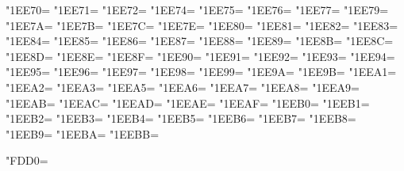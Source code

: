 \XeTeXcharclass"1EE70=\KclassArabU
\XeTeXcharclass"1EE71=\KclassArabU
\XeTeXcharclass"1EE72=\KclassArabU
\XeTeXcharclass"1EE74=\KclassArabU
\XeTeXcharclass"1EE75=\KclassArabU
\XeTeXcharclass"1EE76=\KclassArabU
\XeTeXcharclass"1EE77=\KclassArabU
\XeTeXcharclass"1EE79=\KclassArabU
\XeTeXcharclass"1EE7A=\KclassArabU
\XeTeXcharclass"1EE7B=\KclassArabU
\XeTeXcharclass"1EE7C=\KclassArabU
\XeTeXcharclass"1EE7E=\KclassArabU
\XeTeXcharclass"1EE80=\KclassArabU
\XeTeXcharclass"1EE81=\KclassArabU
\XeTeXcharclass"1EE82=\KclassArabU
\XeTeXcharclass"1EE83=\KclassArabU
\XeTeXcharclass"1EE84=\KclassArabU
\XeTeXcharclass"1EE85=\KclassArabU
\XeTeXcharclass"1EE86=\KclassArabU
\XeTeXcharclass"1EE87=\KclassArabU
\XeTeXcharclass"1EE88=\KclassArabU
\XeTeXcharclass"1EE89=\KclassArabU
\XeTeXcharclass"1EE8B=\KclassArabU
\XeTeXcharclass"1EE8C=\KclassArabU
\XeTeXcharclass"1EE8D=\KclassArabU
\XeTeXcharclass"1EE8E=\KclassArabU
\XeTeXcharclass"1EE8F=\KclassArabU
\XeTeXcharclass"1EE90=\KclassArabU
\XeTeXcharclass"1EE91=\KclassArabU
\XeTeXcharclass"1EE92=\KclassArabU
\XeTeXcharclass"1EE93=\KclassArabU
\XeTeXcharclass"1EE94=\KclassArabU
\XeTeXcharclass"1EE95=\KclassArabU
\XeTeXcharclass"1EE96=\KclassArabU
\XeTeXcharclass"1EE97=\KclassArabU
\XeTeXcharclass"1EE98=\KclassArabU
\XeTeXcharclass"1EE99=\KclassArabU
\XeTeXcharclass"1EE9A=\KclassArabU
\XeTeXcharclass"1EE9B=\KclassArabU
\XeTeXcharclass"1EEA1=\KclassArabU
\XeTeXcharclass"1EEA2=\KclassArabU
\XeTeXcharclass"1EEA3=\KclassArabU
\XeTeXcharclass"1EEA5=\KclassArabU
\XeTeXcharclass"1EEA6=\KclassArabU
\XeTeXcharclass"1EEA7=\KclassArabU
\XeTeXcharclass"1EEA8=\KclassArabU
\XeTeXcharclass"1EEA9=\KclassArabU
\XeTeXcharclass"1EEAB=\KclassArabU
\XeTeXcharclass"1EEAC=\KclassArabU
\XeTeXcharclass"1EEAD=\KclassArabU
\XeTeXcharclass"1EEAE=\KclassArabU
\XeTeXcharclass"1EEAF=\KclassArabU
\XeTeXcharclass"1EEB0=\KclassArabU
\XeTeXcharclass"1EEB1=\KclassArabU
\XeTeXcharclass"1EEB2=\KclassArabU
\XeTeXcharclass"1EEB3=\KclassArabU
\XeTeXcharclass"1EEB4=\KclassArabU
\XeTeXcharclass"1EEB5=\KclassArabU
\XeTeXcharclass"1EEB6=\KclassArabU
\XeTeXcharclass"1EEB7=\KclassArabU
\XeTeXcharclass"1EEB8=\KclassArabU
\XeTeXcharclass"1EEB9=\KclassArabU
\XeTeXcharclass"1EEBA=\KclassArabU
\XeTeXcharclass"1EEBB=\KclassArabU

\XeTeXcharclass"FDD0=\KclassIgnore

